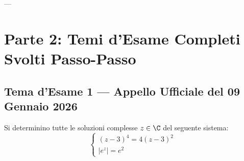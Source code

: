 ---

\section{Parte 2: Temi d'Esame Completi Svolti Passo-Passo}

\subsection{Tema d'Esame 1 — Appello Ufficiale del 09 Gennaio 2026}

\begin{tcolorbox}[colback=white, colframe=navyblue, title={\textbf{Testo del Problema 1 — Campo Complesso}}]
Si determinino tutte le soluzioni complesse $z \in \C$ del seguente sistema:
\begin{equation}
    \begin{cases}
        (z - 3)^4 = 4(z - 3)^2 \\
        |e^z| = e^2
    \end{cases}
\end{equation}
\end{tcolorbox}

